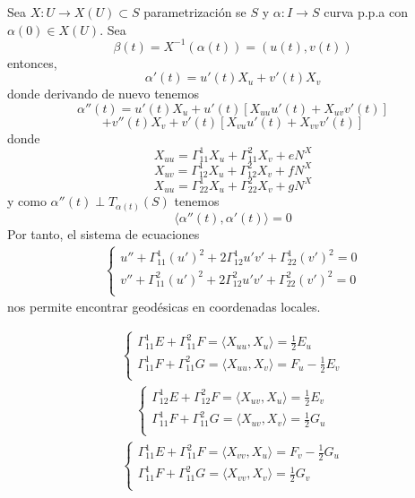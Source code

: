 \begin{ejm}
  Sea $X : U \to X(U) \subset S$ parametrización se $S$ y $\alpha : I \to S$ curva p.p.a con $\alpha(0) \in X(U)$. Sea
  \[ 
    \beta(t) = X^{-1}(\alpha(t)) = (u(t), v(t))
  \] 
  entonces,
  \[ 
    \alpha'(t) = u'(t) X_{u} + v'(t) X_{v} 
  \] 
  donde derivando de nuevo tenemos
  \[ 
    \alpha''(t) = u'(t) X_{u} + u'(t)[X_{uu} u'(t) + X_{uv}v'(t)]
  \] 
  \[ 
    + v''(t) X_{v} + v'(t)[X_{vu} u'(t) + X_{vv}v'(t)] 
  \] 
  donde
  \[ 
    X_{uu} = \Gamma_{11}^{1} X_{u} + \Gamma_{11}^{2} X_{v} + e N^{X}
  \] 
  \[ 
    X_{uv} = \Gamma_{12}^{1} X_{u} + \Gamma_{12}^{2} X_{v} + f N^{X}
  \] 
  \[ 
    X_{uu} = \Gamma_{22}^{1} X_{u} + \Gamma_{22}^{2} X_{v} + g N^{X}
  \] 
  y como $\alpha''(t) \perp T_{\alpha(t)}(S)$ tenemos
  \[ 
    \langle \alpha''(t){ , }\alpha'(t) \rangle = 0
  \] 
  Por tanto, el sistema de ecuaciones
  \[ 
    \begin{aligned}
      \begin{cases}
        u'' + \Gamma_{11}^{1}(u')^{2} + 2\Gamma_{12}^{1}u' v' + \Gamma_{22}^{1}(v')^{2} = 0 \\
        v'' + \Gamma_{11}^{2}(u')^{2} + 2\Gamma_{12}^{2}u' v' + \Gamma_{22}^{2}(v')^{2} = 0 \\
      \end{cases}
    \end{aligned} 
  \] 
  nos permite encontrar geodésicas en coordenadas locales.
\end{ejm}

\begin{nota}
  \[ 
    \begin{aligned}
      \begin{cases}
        \Gamma_{11}^{1} E + \Gamma_{11}^{2} F = \langle X_{uu}{ , }X_{u} \rangle = \frac{1}{2} E_{u} \\
        \Gamma_{11}^{1} F + \Gamma_{11}^{2} G = \langle X_{uu}{ , }X_{v} \rangle = F_{u} - \frac{1}{2} E_{v} \\
      \end{cases}
    \end{aligned} 
  \] 
  \[ 
    \begin{aligned}
      \begin{cases}
        \Gamma_{12}^{1} E + \Gamma_{12}^{2} F = \langle X_{uv}{ , }X_{u} \rangle = \frac{1}{2} E_{v} \\
        \Gamma_{11}^{1} F + \Gamma_{11}^{2} G = \langle X_{uv}{ , }X_{v} \rangle = \frac{1}{2}G_{u} \\
      \end{cases}
    \end{aligned} 
  \] 
  \[ 
    \begin{aligned}
      \begin{cases}
        \Gamma_{11}^{1} E + \Gamma_{11}^{2} F = \langle X_{vv}{ , }X_{u} \rangle = F_{v} - \frac{1}{2} G_{u} \\
        \Gamma_{11}^{1} F + \Gamma_{11}^{2} G = \langle X_{vv}{ , }X_{v} \rangle = \frac{1}{2} G_{v} \\
      \end{cases}
    \end{aligned} 
  \] 
\end{nota}

